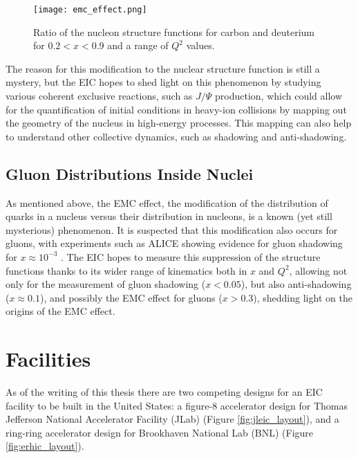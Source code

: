 \begin{figure}[ht]
	\centering
	\texttt{[image: emc\_effect.png]}
	\caption{Ratio of the nucleon structure functions for carbon and deuterium for $0.2 < x < 0.9$ and a range of $Q^2$ values.}
	\label{fig:emc_effect}
\end{figure}

The reason for this modification to the nuclear structure function is still a mystery, but the EIC hopes to shed light on this phenomenon by studying various coherent exclusive reactions, such as $J/\Psi$ production, which could allow for the quantification of initial conditions in heavy-ion collisions by mapping out the geometry of the nucleus in high-energy processes. This mapping can also help to understand other collective dynamics, such as shadowing and anti-shadowing.

\subsection{Gluon Distributions Inside Nuclei}
As mentioned above, the EMC effect, the modification of the distribution of quarks in a nucleus versus their distribution in nucleons, is a known (yet still mysterious) phenomenon. It is suspected that this modification also occurs for gluons, with experiments such as ALICE showing evidence for gluon shadowing for $x \approx 10^{-3}$ \cite{ALICE_antishadowing}. The EIC hopes to measure this suppression of the structure functions thanks to its wider range of kinematics both in $x$ and $Q^2$, allowing not only for the measurement of gluon shadowing ($x < 0.05$), but also anti-shadowing ($x \approx 0.1$), and possibly the EMC effect for gluons ($x > 0.3$), shedding light on the origins of the EMC effect.

\section{Facilities}
As of the writing of this thesis there are two competing designs for an EIC facility to be built in the United States: a figure-8 accelerator design for Thomas Jefferson National Accelerator Facility (JLab) (Figure \ref{fig:jleic_layout}), and a ring-ring accelerator design for Brookhaven National Lab (BNL) (Figure \ref{fig:erhic_layout}).


